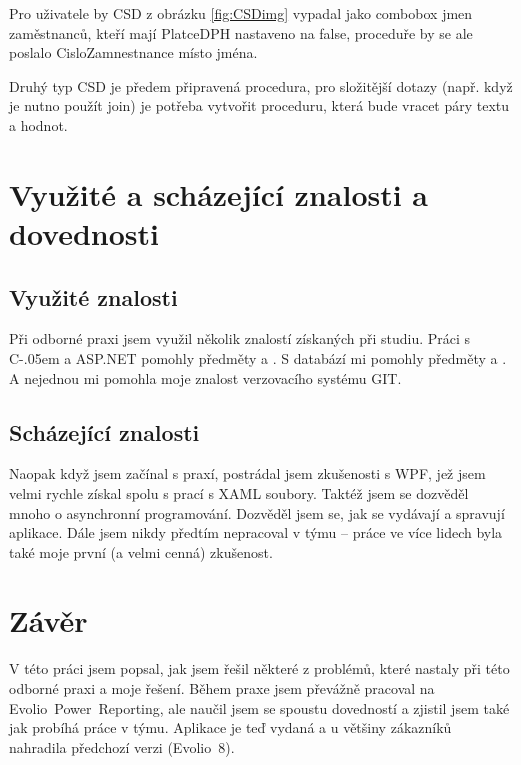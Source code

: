 \documentclass[czech,bachelorpractice,dept460,male,csharp]{diploma}
\newcommand{\EvolioEight}{Evolio~8}
\newcommand{\EFilters}{Evolio~Power~Reporting}
\newcommand{\Csharp}{%
  {\settoheight{\dimen0}{C}C\kern-.05em \resizebox{!}{\dimen0}{\raisebox{\depth}{\#}}}}
\begin{document}
			Pro uživatele by CSD z obrázku \ref{fig:CSDimg} vypadal jako combobox jmen zaměstnanců, kteří mají PlatceDPH nastaveno na false, proceduře by se ale poslalo CisloZamnestnance místo jména.
			
			Druhý typ CSD je předem připravená procedura, pro složitější dotazy (např. když je nutno použít join) je potřeba vytvořit proceduru, která bude vracet páry textu a hodnot.
			
\section{Využité a scházející znalosti a dovednosti}
\label{txt:c4}
	\subsection{Využité znalosti}
		Při odborné praxi jsem využil několik znalostí získaných při studiu. Práci s {\Csharp} a ASP.NET pomohly předměty  a . S databází mi pomohly předměty  a . A nejednou mi pomohla moje znalost verzovacího systému GIT.
	\subsection{Scházející znalosti}
		Naopak když jsem začínal s praxí, postrádal jsem zkušenosti s WPF, jež jsem velmi rychle získal spolu s prací s XAML soubory. Taktéž jsem se dozvěděl mnoho o asynchronní programování. Dozvěděl jsem se, jak se vydávají a spravují aplikace. Dále jsem nikdy předtím  nepracoval v týmu -- práce ve více lidech byla také moje první (a velmi cenná) zkušenost.
		
\section{Závěr}
\label{txt:c5}
V této práci jsem popsal, jak jsem řešil některé z problémů, které nastaly při této odborné praxi a moje řešení. Během praxe jsem převážně pracoval na {\EFilters}, ale naučil jsem se spoustu dovedností a zjistil jsem také jak probíhá práce v týmu. Aplikace je teď vydaná a u většiny zákazníků nahradila předchozí verzi ({\EvolioEight}). 

\printbibliography[title={Literatura}, heading=bibintoc]


\end{document}
